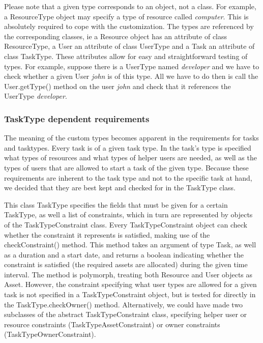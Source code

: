 				Please note that a given type corresponds to an object, not a class. For example, a ResourceType object may specify a type of resource called \emph{computer}. This is absolutely required to cope with the customization. The types are referenced by the corresponding classes, ie a Resource object has an attribute of class ResourceType, a User an attribute of class UserType and a Task an attribute of class TaskType. These attributes allow for easy and straightforward testing of types. For example, suppose there is a UserType named \emph{developer} and we have to check whether a given User \emph{john} is of this type. All we have to do then is call the User.getType() method on the user \emph{john} and check that it references the UserType \emph{developer}.
			\subsubsection{TaskType dependent requirements}
				The meaning of the custom types becomes apparent in the requirements for tasks and tasktypes. Every task is of a given task type. In the task's type is specified what types of resources and what types of helper users are needed, as well as the types of users that are allowed to start a task of the given type. Because these requirements are inherent to the task type and not to the specific task at hand, we decided that they are best kept and checked for in the TaskType class.
				
				This class TaskType specifies the fields that must be given for a certain TaskType, as well a list of constraints, which in turn are represented by objects of the TaskTypeConstraint class. Every TaskTypeConstraint object can check whether the constraint it represents is satisfied, making use of the checkConstraint() method. This method takes an argument of type Task, as well as a duration and a start date, and returns a boolean indicating whether the constraint is satisfied (the required assets are allocated) during the given time interval. The method is polymorph, treating both Resource and User objects as Asset. However, the constraint specifying what user types are allowed for a given task is not specified in a TaskTypeConstraint object, but is tested for directly in the TaskType.checkOwner() method. Alternatively, we could have made two subclasses of the abstract TaskTypeConstraint class, specifying helper user or resource constraints (TaskTypeAssetConstraint) or owner constraints (TaskTypeOwnerConstraint). %
				
